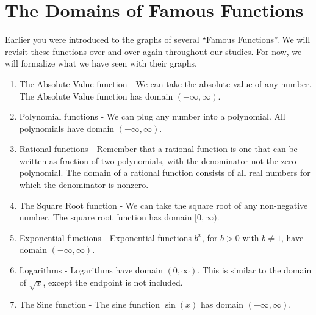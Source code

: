\documentclass[nooutcomes]{ximera}
\begin{document}
\section{The Domains of Famous Functions}
	Earlier you were introduced to the graphs of several ``Famous Functions''.  We will revisit these functions over and over again throughout our studies. For now, we will formalize what we have seen with their graphs.

	\begin{callout}
		\begin{enumerate}	
			\item The Absolute Value function - We can take the absolute value of any number. The Absolute Value function has domain $(-\infty, \infty)$.
	
			\item Polynomial functions - We can plug any number into a polynomial. All polynomials have domain $(-\infty, \infty)$.
	
			\item Rational functions - Remember that a rational function is one that can be written as fraction of two polynomials, with the 
				denominator not the zero polynomial. The domain of a rational function consists of all real numbers for which the denominator is nonzero.
				
			\item The Square Root function - We can take the square root of any non-negative number. The square root function has domain $[0, \infty)$.		
	
			\item Exponential functions - Exponential functions $b^x$, for $b >0$ with $b \neq 1$,  have domain $(-\infty, \infty)$.
	
			\item Logarithms - Logarithms have domain $(0, \infty)$. This is similar to the domain of $\sqrt{x}$, except the endpoint is not included.
	
			\item The Sine function - The sine function $\sin(x)$ has domain $(-\infty, \infty)$.
		\end{enumerate}
	\end{callout}
\end{document}
